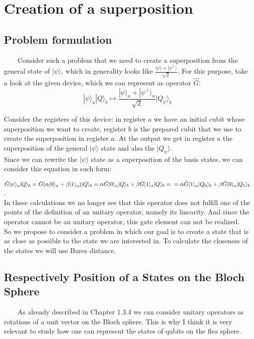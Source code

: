 \documentclass[english,14pt,a4paper]{article}
\begin{document}
	
	\pagebreak
	\section{Creation of a superposition} 
	\subsection{Problem formulation} \ \ \ \
	Consider such a problem that we need to create a superposition from the general state of $|\psi\rangle$, which in generality looks like $ \frac{|\psi\rangle + |\psi^{\perp}\rangle}{\sqrt{2}}$. For this purpose, take a look at the given device, which we can represent as operator $\hat{G}$:
	\begin{equation}\label{popa_muravia}
		|\psi \rangle_a | Q \rangle _b \longmapsto \frac{|\psi \rangle_a + |\psi^{\perp} \rangle_a}{\sqrt{2}} |Q_{\psi} \rangle_b
	\end{equation} 
	
	Consider the registers of this device: in register $a$ we have an initial cubit whose superposition we want to create, register $b$ is the prepared cubit that we use to create the superposition in register $a$. At the output we get in register $a$ the superposition of the general $|\psi \rangle$ state and also the $|Q _{\psi} \rangle$. \\ 
	
	Since we can rewrite the $|\psi \rangle$ state as a superposition of the basis states, we can consider this equation in such form:
	
		$\hat{G}|\psi \rangle_a | Q \rangle _b = \hat{G}(\alpha |0 \rangle_a  + \beta |1 \rangle_a)| Q \rangle _b = \alpha \hat{G}|0 \rangle_a | Q \rangle _b + \beta \hat{G}|1 \rangle_a | Q \rangle _b = \\ = \alpha \hat{G}|1 \rangle_a | Q_0 \rangle _b + \beta \hat{G}|0 \rangle_a | Q_1 \rangle _b$. \\
		
	In these calculations we no longer see that this operator does not fulfill one of the points of the definition of an unitary operator, namely its linearity. And since the operator cannot be an unitary operator, this gate element can not be realized. \\
	
	So we propose to consider a problem in which our goal is to create a state that is as close as possible to the state we are interested in. To calculate the closeness of the states we will use Bures distance. 
	\subsection{Respectively Position of a States on the Bloch Sphere}\ \ \ \
	As already described in Chapter 1.3.4 we can consider unitary operators as rotations of a unit vector on the Bloch sphere. This is why I think it is very relevant to study how one can represent the states of qubits on the flea sphere. \\
	
\end{document}
